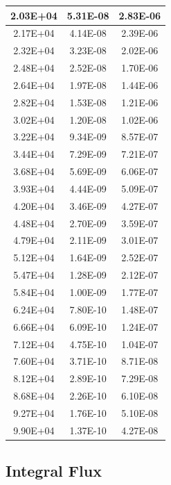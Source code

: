 \documentclass{hitec}
\begin{document}
\begin{table}[h]
{\begin{tabular}{|c|c|c|}
			2.03E+04&	5.31E-08&	2.83E-06\\ \hline
			2.17E+04&	4.14E-08&	2.39E-06\\ \hline
			2.32E+04&	3.23E-08&	2.02E-06\\ \hline
			2.48E+04&	2.52E-08&	1.70E-06\\ \hline
			2.64E+04&	1.97E-08&	1.44E-06\\ \hline
			2.82E+04&	1.53E-08&	1.21E-06\\ \hline
			3.02E+04&	1.20E-08&	1.02E-06\\ \hline
			3.22E+04&	9.34E-09&	8.57E-07\\ \hline
			3.44E+04&	7.29E-09&	7.21E-07\\ \hline
			3.68E+04&	5.69E-09&	6.06E-07\\ \hline
			3.93E+04&	4.44E-09&	5.09E-07\\ \hline
			4.20E+04&	3.46E-09&	4.27E-07\\ \hline
			4.48E+04&	2.70E-09&	3.59E-07\\ \hline
			4.79E+04&	2.11E-09&	3.01E-07\\ \hline
			5.12E+04&	1.64E-09&	2.52E-07\\ \hline
			5.47E+04&	1.28E-09&	2.12E-07\\ \hline
			5.84E+04&	1.00E-09&	1.77E-07\\ \hline
			6.24E+04&	7.80E-10&	1.48E-07\\ \hline
			6.66E+04&	6.09E-10&	1.24E-07\\ \hline
			7.12E+04&	4.75E-10&	1.04E-07\\ \hline
			7.60E+04&	3.71E-10&	8.71E-08\\ \hline
			8.12E+04&	2.89E-10&	7.29E-08\\ \hline
			8.68E+04&	2.26E-10&	6.10E-08\\ \hline
			9.27E+04&	1.76E-10&	5.10E-08\\ \hline
			9.90E+04&	1.37E-10&	4.27E-08\\ \hline
		\end{tabular}%
	}
\end{table}


\clearpage %

\subsection{Integral Flux}

\end{document}
